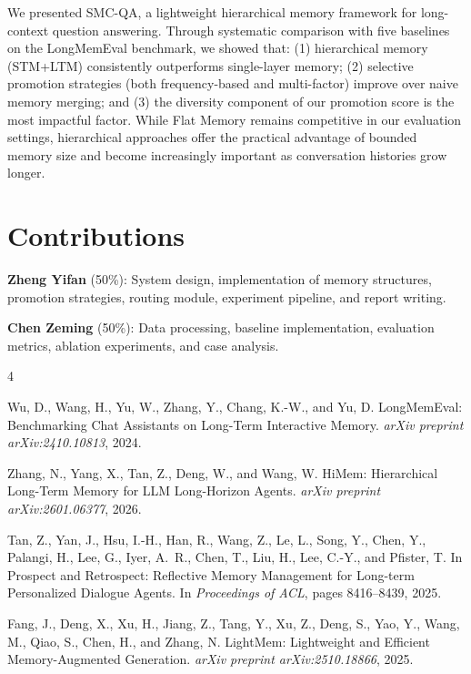 \documentclass{article}
\begin{document}
We presented SMC-QA, a lightweight hierarchical memory framework for long-context question answering. Through systematic comparison with five baselines on the LongMemEval benchmark, we showed that: (1) hierarchical memory (STM+LTM) consistently outperforms single-layer memory; (2) selective promotion strategies (both frequency-based and multi-factor) improve over naive memory merging; and (3) the diversity component of our promotion score is the most impactful factor. While Flat Memory remains competitive in our evaluation settings, hierarchical approaches offer the practical advantage of bounded memory size and become increasingly important as conversation histories grow longer.

\section{Contributions}

\textbf{Zheng Yifan} (50\%): System design, implementation of memory structures, promotion strategies, routing module, experiment pipeline, and report writing.

\textbf{Chen Zeming} (50\%): Data processing, baseline implementation, evaluation metrics, ablation experiments, and case analysis.


\begin{thebibliography}{4}

Wu, D., Wang, H., Yu, W., Zhang, Y., Chang, K.-W., and Yu, D.
\newblock LongMemEval: Benchmarking Chat Assistants on Long-Term Interactive Memory.
\newblock \emph{arXiv preprint arXiv:2410.10813}, 2024.

Zhang, N., Yang, X., Tan, Z., Deng, W., and Wang, W.
\newblock HiMem: Hierarchical Long-Term Memory for LLM Long-Horizon Agents.
\newblock \emph{arXiv preprint arXiv:2601.06377}, 2026.

Tan, Z., Yan, J., Hsu, I.-H., Han, R., Wang, Z., Le, L., Song, Y., Chen, Y., Palangi, H., Lee, G., Iyer, A.~R., Chen, T., Liu, H., Lee, C.-Y., and Pfister, T.
\newblock In Prospect and Retrospect: Reflective Memory Management for Long-term Personalized Dialogue Agents.
\newblock In \emph{Proceedings of ACL}, pages 8416--8439, 2025.

Fang, J., Deng, X., Xu, H., Jiang, Z., Tang, Y., Xu, Z., Deng, S., Yao, Y., Wang, M., Qiao, S., Chen, H., and Zhang, N.
\newblock LightMem: Lightweight and Efficient Memory-Augmented Generation.
\newblock \emph{arXiv preprint arXiv:2510.18866}, 2025.

\end{thebibliography}
\end{document}
